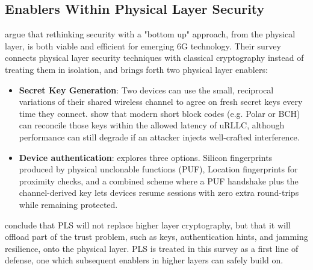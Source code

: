 \documentclass[acmtog]{acmart}
\begin{document}
\subsection{Enablers Within Physical Layer Security}
\cite{ref1} argue that rethinking security with a "bottom up" approach, from the physical layer, is both viable and efficient for emerging 6G technology. Their survey connects physical layer security techniques with classical cryptography instead of treating them in isolation, and brings forth two physical layer enablers:
\begin{itemize}
  \item \textbf{Secret Key Generation}: Two devices can use the small, reciprocal variations of their shared wireless channel to agree on fresh secret keys every time they connect. \cite{ref1} show that modern short block codes (e.g. Polar or BCH) can reconcile those keys within the allowed latency of uRLLC, although performance can still degrade if an attacker injects well-crafted interference.
  \item \textbf{Device authentication}: \cite{ref1} explores three options. Silicon fingerprints produced by physical unclonable functions (PUF), Location fingerprints for proximity checks, and a combined scheme where a PUF handshake plus the channel-derived key lets devices resume sessions with zero extra round-trips while remaining protected.
\end{itemize}
\cite{ref1} conclude that PLS will not replace higher layer cryptography, but that it will offload part of the trust problem, such as keys, authentication hints, and jamming resilience, onto the physical layer. PLS is treated in this survey as a first line of defense, one which subsequent enablers in higher layers can safely build on.
\end{document}
